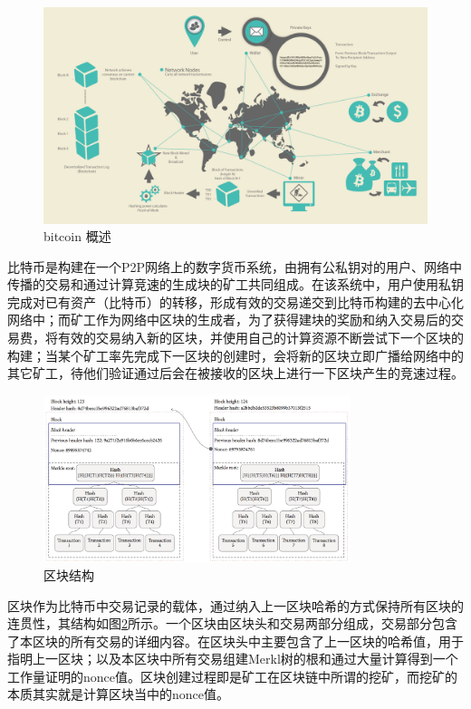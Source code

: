 \begin{figure}[htbp]
 	\centering
 	\includegraphics[width = 1\textwidth]{img/bitcoin}
 	\caption{bitcoin 概述\cite{antonopoulos2014mastering}}\label{fig:bitcoin}
\end{figure}

比特币是构建在一个P2P网络上的数字货币系统，由拥有公私钥对的用户、网络中传播的交易和通过计算竞速的生成块的矿工共同组成。在该系统中，用户使用私钥完成对已有资产（比特币）的转移，形成有效的交易递交到比特币构建的去中心化网络中；而矿工作为网络中区块的生成者，为了获得建块的奖励和纳入交易后的交易费，将有效的交易纳入新的区块，并使用自己的计算资源不断尝试下一个区块的构建；当某个矿工率先完成下一区块的创建时，会将新的区块立即广播给网络中的其它矿工，待他们验证通过后会在被接收的区块上进行一下区块产生的竞速过程。




\begin{figure}[!htbp]
 	\centering
 	\includegraphics[width = 0.8\textwidth]{img/block_structure}
 	\caption{区块结构}\label{fig:block_structure}
\end{figure}

区块作为比特币中交易记录的载体，通过纳入上一区块哈希的方式保持所有区块的连贯性，其结构如图\ref{fig:block_structure}所示。一个区块由区块头和交易两部分组成，交易部分包含了本区块的所有交易的详细内容。在区块头中主要包含了上一区块的哈希值，用于指明上一区块；以及本区块中所有交易组建Merkl树的根和通过大量计算得到一个工作量证明的nonce值。区块创建过程即是矿工在区块链中所谓的挖矿，而挖矿的本质其实就是计算区块当中的nonce值。





